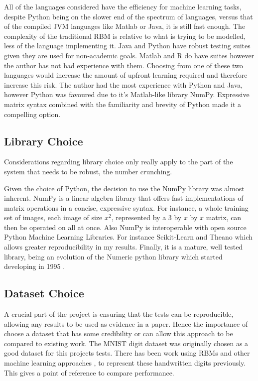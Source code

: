All of the languages considered have the efficiency for machine learning tasks, despite Python being on the slower end of the spectrum of languages, versus that of the compiled JVM languages like Matlab or Java, it is still fast enough. The complexity of the traditional RBM is relative to what is trying to be modelled, less of the language implementing it.
Java and Python have robust testing suites given they are used for non-academic goals. Matlab and R do have suites however the author has not had experience with them. Choosing from one of these two languages would increase the amount of upfront learning required and therefore increase this risk.
The author had the most experience with Python and Java, however Python was favoured due to it's Matlab-like library NumPy. Expressive matrix syntax combined with the familiarity and brevity of Python made it a compelling option.

\subsection{Library Choice}\label{SS:Lib}

Considerations regarding library choice only really apply to the part of the system that needs to be robust, the number crunching. 

Given the choice of Python, the decision to use the NumPy library was almost inherent. NumPy is a linear algebra library that offers fast implementations of matrix operations in a concise, expressive syntax. For instance, a whole training set of images, each image of size $ x^2 $, represented by a $ 3 $ by $ x$ by $x $ matrix, can then be operated on all at once. Also NumPy is interoperable with open source Python Machine Learning Libraries. For instance Scikit-Learn \cite{scikit-learn} and Theano \cite{bergstra+al:2010-scipy} which allows greater reproducibility in my results. Finally, it is a mature, well tested library, being an evolution of the Numeric python library which started developing in 1995 \cite{2015HistSciPy}.

\subsection{Dataset Choice}

A crucial part of the project is ensuring that the tests can be reproducible, allowing any results to be used as evidence in a paper. Hence the importance of choose a dataset that has some credibility or can allow this approach to be compared to existing work. The MNIST digit dataset was originally chosen as a good dataset for this projects tests. There has been work using RBMs \cite{Hinton:2006dk} and other machine learning approaches \cite{Lecun:1998hy},  to represent these handwritten digits previously. This gives a point of reference to compare performance. 

